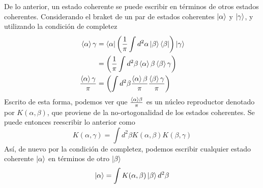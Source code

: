De lo anterior, un estado coherente se puede escribir en términos de otros estados coherentes. Considerando el braket de un par de estados coherentes $\ket{\alpha}$ y $\ket{\gamma}$, y utilizando la condición de completez
\begin{align*}
  \braket{\alpha}{\gamma}             & =  \bra{{\alpha}}\left(\frac{1}{\pi}\int d^2 \alpha \ket{\beta}\bra{\beta} \right) \ket{\gamma}      \\
                                      & = \left(\frac{1}{\pi}\int d^2 \beta \braket{\alpha}{\beta}\braket{\beta}{\gamma} \right)             \\
  \frac{\braket{\alpha}{\gamma}}{\pi} & = \left(\int d^2 \beta \frac{\braket{\alpha}{\beta}}{\pi} \frac{\braket{\beta}{\gamma}}{\pi} \right)
\end{align*}
Escrito de esta forma, podemos ver que $\frac{\braket{\alpha}{\beta}}{\pi}$ es un núcleo reproductor denotado por $K(\alpha, \beta)$, que proviene de la no-ortogonalidad de los estados coherentes. Se puede entonces reescribir lo anterior como
\begin{equation*}
  K(\alpha, \gamma) = \int d^2 \beta K(\alpha, \beta) K(\beta, \gamma)
\end{equation*}
Así, de nuevo por la condición de completez, podemos escribir cualquier estado coherente $\ket{\alpha}$ en términos de otro $\ket{\beta}$
\begin{equation*}
  \ket{\alpha} = \int K(\alpha, \beta) \ket{\beta} d^2\beta
\end{equation*}

